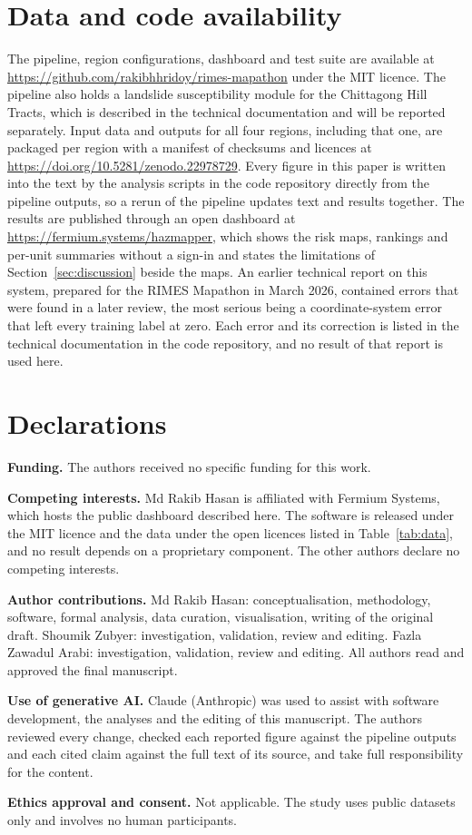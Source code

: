 \section*{Data and code availability}

The pipeline, region configurations, dashboard and test suite are available at \url{https://github.com/rakibhhridoy/rimes-mapathon} under the MIT licence. The pipeline also holds a landslide susceptibility module for the Chittagong Hill Tracts, which is described in the technical documentation and will be reported separately. Input data and outputs for all four regions, including that one, are packaged per region with a manifest of checksums and licences at \url{https://doi.org/10.5281/zenodo.22978729}. Every figure in this paper is written into the text by the analysis scripts in the code repository directly from the pipeline outputs, so a rerun of the pipeline updates text and results together. The results are published through an open dashboard at \url{https://fermium.systems/hazmapper}, which shows the risk maps, rankings and per-unit summaries without a sign-in and states the limitations of Section~\ref{sec:discussion} beside the maps. An earlier technical report on this system, prepared for the RIMES Mapathon in March 2026, contained errors that were found in a later review, the most serious being a coordinate-system error that left every training label at zero. Each error and its correction is listed in the technical documentation in the code repository, and no result of that report is used here.

\section*{Declarations}

\textbf{Funding.} The authors received no specific funding for this work.

\textbf{Competing interests.} Md Rakib Hasan is affiliated with Fermium Systems, which hosts the public dashboard described here. The software is released under the MIT licence and the data under the open licences listed in Table~\ref{tab:data}, and no result depends on a proprietary component. The other authors declare no competing interests.

\textbf{Author contributions.} Md Rakib Hasan: conceptualisation, methodology, software, formal analysis, data curation, visualisation, writing of the original draft. Shoumik Zubyer: investigation, validation, review and editing. Fazla Zawadul Arabi: investigation, validation, review and editing. All authors read and approved the final manuscript.

\textbf{Use of generative AI.} Claude (Anthropic) was used to assist with software development, the analyses and the editing of this manuscript. The authors reviewed every change, checked each reported figure against the pipeline outputs and each cited claim against the full text of its source, and take full responsibility for the content.

\textbf{Ethics approval and consent.} Not applicable. The study uses public datasets only and involves no human participants.

